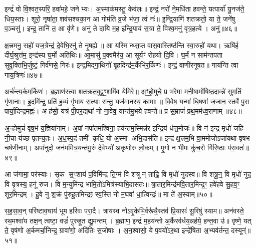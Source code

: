 {\anuvakamend[{प्र॒ति॒ष्ठाम॑ह्व॒दस्तु॑ वि॒द्युतं॑ वस॒न्तमे॒वेन्द्र॑स्या॒ऽष्टात्रिꣳ॑शच्च॥11॥}]}

इन्द्रं॑ वो वि॒श्वत॒स्परि॒ हवा॑महे॒ जनेभ्यः। अ॒स्माक॑मस्तु॒ केव॑लः॥ इन्द्रं॒ नरो॑ ने॒मधि॑ता हवन्ते॒ यत्पार्या॑ यु॒नज॑ते॒ धिय॒स्ताः। शूरो॒ नृषा॑ता॒ शव॑सश्चका॒न आ गोम॑ति व्र॒जे भ॑जा॒ त्वं नः॑॥ इ॒न्द्रि॒याणि॑ शतक्रतो॒ या ते॒ जने॑षु प॒ञ्चसु॑। इन्द्र॒ तानि॑ त॒ आ वृ॑णे॥ अनु॑ ते दायि म॒ह इ॑न्द्रि॒याय॑ स॒त्रा ते॒ विश्व॒मनु॑ वृत्र॒हत्ये। अनु॑॥४६॥

क्ष॒त्त्रमनु॒ सहो॑ यज॒त्रेन्द्र॑ दे॒वेभि॒रनु॑ ते नृ॒षह्ये॥ आ यस्मिन्थ्स॒प्त वा॑स॒वास्तिष्ठ॑न्ति स्वा॒रुहो॑ यथा। ऋषि॑र्\mbox{}ह दीर्घ॒श्रुत्त॑म॒ इन्द्र॑स्य घ॒र्मो अति॑थिः॥ आ॒मासु॑ प॒क्वमैर॑य॒ आ सूर्यꣳ॑ रोहयो दि॒वि। घ॒र्मं न साम॑न्तपता सुवृ॒क्तिभि॒र्जुष्टं॒ गिर्व॑णसे॒ गिरः॑॥ इन्द्र॒मिद्गा॒थिनो॑ बृ॒हदिन्द्र॑म॒र्केभि॑र॒र्किणः॑। इन्द्रं॒ वाणी॑रनूषत॥ गाय॑न्ति त्वा गाय॒त्रिणः॑॥४७॥

अर्च॑न्त्य॒र्कम॒र्किणः॑। ब्र॒ह्माण॑स्त्वा शतक्रत॒वुद्व॒ꣳ॒शमि॑व येमिरे॥ अ॒ꣳ॒हो॒मुचे॒ प्र भ॑रेमा मनी॒षामो॑षिष्ठ॒दाव्न्ने॑ सुम॒तिं गृ॑णा॒नाः। इ॒दमि॑न्द्र॒ प्रति॑ ह॒व्यं गृ॑भाय स॒त्याः स॑न्तु॒ यज॑मानस्य॒ कामाः॥ वि॒वेष॒ यन्मा॑ धि॒षणा॑ ज॒जान॒ स्तवै॑ पु॒रा पार्या॒दिन्द्र॒मह्नः॑। अह॑सो॒ यत्र॑ पी॒पर॒द्यथा॑ नो ना॒वेव॒ यान्त॑मु॒भये॑ हवन्ते॥ प्र स॒म्राजं॑ प्रथ॒मम॑ध्व॒राणाम्॥४८॥

अ॒ꣳ॒हो॒मुचं॑ वृष॒भं य॒ज्ञिया॑नाम्। अ॒पां नपा॑तमश्विना॒ हय॑न्तम॒स्मिन्न॑र इन्द्रि॒यं ध॑त्त॒मोजः॑॥ वि न॑ इन्द्र॒ मृधो॑ जहि नी॒चा य॑च्छ पृतन्य॒तः। अ॒ध॒स्प॒दं तमीं कृधि॒ यो अ॒स्मा अ॑भि॒दास॑ति॥ इन्द्र॑ क्ष॒त्त्रम॒भि वा॒ममोजोऽजा॑यथा वृषभ चर्\mbox{}षणी॒नाम्। अपा॑नुदो॒ जन॑ममित्र॒यन्त॑मु॒रुं दे॒वेभ्यो॑ अकृणोरु लो॒कम्॥ मृ॒गो न भी॒मः कु॑च॒रो गि॑रि॒ष्ठाः प॑रा॒वतः॑॥४९॥

आ ज॑गामा॒ पर॑स्याः। सृ॒क स॒ꣳ॒शाय॑ प॒विमि॑न्द्र ति॒ग्मं वि शत्रून् ताढि॒ वि मृधो॑ नुदस्व॥ वि शत्रू॒न्॒ वि मृधो॑ नुद॒ वि वृ॒त्रस्य॒ हनू॑ रुज। वि म॒न्युमि॑न्द्र भामि॒तो॑ऽमित्र॑स्याभि॒दास॑तः॥ त्रा॒तार॒मिन्द्र॑मवि॒तार॒मिन्द्र॒ꣳ॒ हवे॑हवे सु॒हव॒ꣳ॒ शूर॒मिन्द्रम्। हु॒वे नु श॒क्रं पु॑रुहू॒तमिन्द्रꣵ॑ स्व॒स्ति नो॑ म॒घवा॑ धा॒त्विन्द्रः॑॥ मा ते॑ अ॒स्याम्॥५०॥

स॒ह॒सा॒व॒न् परि॑ष्टाव॒घाय॑ भूम हरिवः परा॒दै। त्राय॑स्व नोऽवृ॒केभि॒र्वरू॑थै॒स्तव॑ प्रि॒यासः॑ सू॒रिषु॑ स्याम॥ अन॑वस्ते॒ रथ॒मश्वा॑य तक्ष॒न् त्वष्टा॒ वज्रं॑ पुरुहूत द्यु॒मन्तम्। ब्र॒ह्माण॒ इन्द्रं॑ म॒हय॑न्तो अ॒र्कैरव॑र्धय॒न्नह॑ये॒ हन्त॒वा उ॑॥ वृष्णे॒ यत् ते॒ वृष॑णो अ॒र्कमर्चा॒निन्द्र॒ ग्रावा॑णो॒ अदि॑तिः स॒जोषाः। अ॒न॒श्वासो॒ ये प॒वयो॑ऽर॒था इन्द्रे॑षिता अ॒भ्यव॑र्तन्त॒ दस्यून्॑॥५१॥

